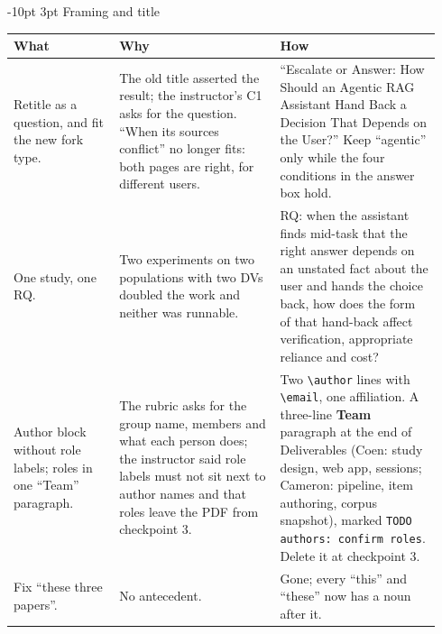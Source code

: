 \documentclass[9pt,letterpaper]{extarticle}
\makeatletter
\newcommand{\rowsep}{\noalign{\vskip 1.5pt}\arrayrulecolor{black!35}\hline\arrayrulecolor{black}\noalign{\vskip 1.5pt}}
\renewcommand\section{\@startsection{section}{1}{\z@}%
  {-10pt \@plus -2pt \@minus -1pt}{3pt}%
  {\sffamily\bfseries\large\color{accent}}}
\let\oldsection\section
\renewcommand{\section}{\needspace{7\baselineskip}\oldsection}
\newcommand{\wwh}{\toprule
\sffamily\bfseries\color{accent} What & \sffamily\bfseries\color{accent} Why & \sffamily\bfseries\color{accent} How \\
\midrule}
\newenvironment{wwhtable}{\footnotesize
\begin{longtable}{@{}>{\raggedright\arraybackslash}p{0.23\linewidth}>{\raggedright\arraybackslash}p{0.355\linewidth}>{\raggedright\arraybackslash}p{0.355\linewidth}@{}}
\wwh}{\bottomrule\end{longtable}}
\makeatother
\begin{document}
\section{Framing and title}
\begin{wwhtable}
Retitle as a question, and fit the new fork type. &
The old title asserted the result; the instructor's C1 asks for the question.
``When its sources conflict'' no longer fits: both pages are right, for
different users. &
``Escalate or Answer: How Should an Agentic RAG Assistant Hand Back a Decision
That Depends on the User?'' Keep ``agentic'' only while the four conditions in
the answer box hold. \\
\rowsep
One study, one RQ. &
Two experiments on two populations with two DVs doubled the work and
neither was runnable. &
RQ: when the assistant finds mid-task that the right answer depends on an
unstated fact about the user and hands the choice back, how does the form of
that hand-back affect verification, appropriate reliance and cost? \\
\rowsep
Author block without role labels; roles in one ``Team'' paragraph. &
The rubric asks for the group name, members and what each person does; the
instructor said role labels must not sit next to author names and that roles
leave the PDF from checkpoint 3. &
Two \verb|\author| lines with \verb|\email|, one affiliation. A three-line
\textbf{Team} paragraph at the end of Deliverables (Coen: study design, web
app, sessions; Cameron: pipeline, item authoring, corpus snapshot), marked
\texttt{TODO authors: confirm roles}. Delete it at checkpoint 3. \\
\rowsep
Fix ``these three papers''. &
No antecedent. &
Gone; every ``this'' and ``these'' now has a noun after it. \\
\end{wwhtable}
\end{document}
